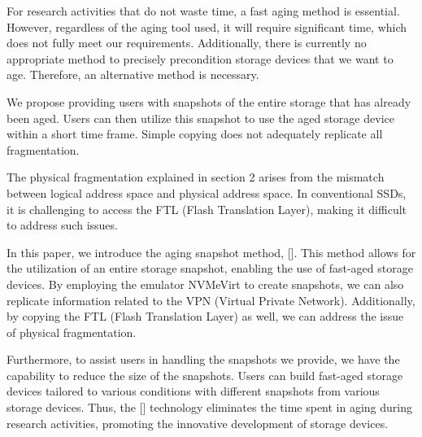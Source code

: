 For research activities that do not waste time, a fast aging method is essential. 
However, regardless of the aging tool used, it will require significant time, which does not fully meet our requirements. 
Additionally, there is currently no appropriate method to precisely precondition storage devices that we want to age.
Therefore, an alternative method is necessary.

We propose providing users with snapshots of the entire storage that has already been aged. 
Users can then utilize this snapshot to use the aged storage device within a short time frame. 
Simple copying does not adequately replicate all fragmentation.

The physical fragmentation explained in section 2 arises from the mismatch between logical address space and physical address space. 
In conventional SSDs, it is challenging to access the FTL (Flash Translation Layer), making it difficult to address such issues.

In this paper, we introduce the aging snapshot method, []. 
This method allows for the utilization of an entire storage snapshot, enabling the use of fast-aged storage devices. 
By employing the emulator NVMeVirt to create snapshots, we can also replicate information related to the VPN (Virtual Private Network). 
Additionally, by copying the FTL (Flash Translation Layer) as well, we can address the issue of physical fragmentation.

Furthermore, to assist users in handling the snapshots we provide, we have the capability to reduce the size of the snapshots. 
Users can build fast-aged storage devices tailored to various conditions with different snapshots from various storage devices. 
Thus, the [] technology eliminates the time spent in aging during research activities, promoting the innovative development of storage devices.




